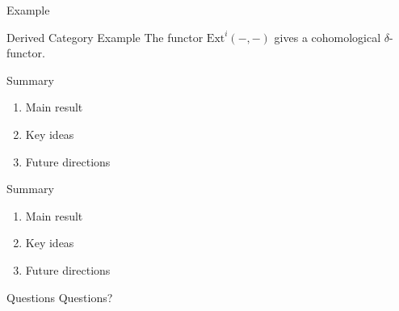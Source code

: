 \documentclass[12pt]{beamer}
\begin{document}
\begin{frame}{Example}
  \begin{exampleblock}{Derived Category Example}
    The functor \( \mathrm{Ext}^i(-,-) \) gives a cohomological \(\delta\)-functor.
  \end{exampleblock}
\end{frame}

\begin{frame}{Summary}
  \begin{enumerate}
    \item Main result
    \item Key ideas
    \item Future directions
  \end{enumerate}
\end{frame}

\begin{frame}{Summary}
  \begin{enumerate}
    \item Main result
    \item Key ideas
    \item Future directions
  \end{enumerate}
\end{frame}
\begin{frame}{Questions}
  \centering
  \Huge Questions?
\end{frame}
\end{document}
